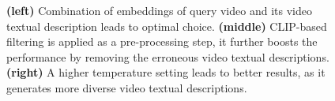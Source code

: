 \documentclass{article} \usepackage{iclr2024_conference,times}
\begin{document}
\begin{figure}[!htb]
    \caption{\textbf{(left)} Combination of embeddings of query video and its video textual description leads to optimal choice. \textbf{(middle)} CLIP-based filtering is applied as a pre-processing step, it further boosts the performance by removing the erroneous video textual descriptions. \textbf{(right)} A higher temperature setting leads to better results, as it generates more diverse video textual descriptions.}
    \label{figure-3}
\end{figure}
































\begin{figure}[!htb]
\end{figure}
\end{document}

